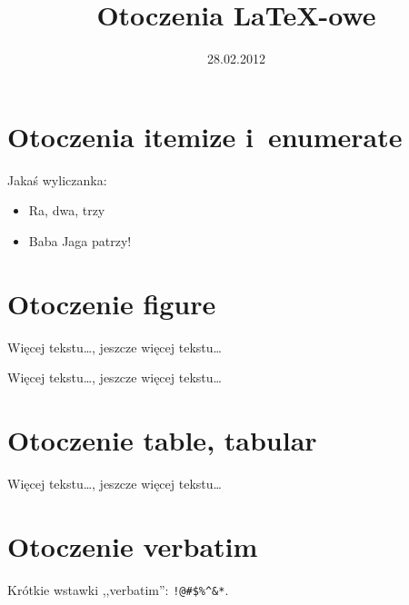 \documentclass[a4paper,12pt]{article}
\title{Otoczenia \LaTeX-owe}
\date{28.02.2012}
\begin{document}
\pagestyle{empty}

\section*{Otoczenia itemize i~enumerate}

Jakaś wyliczanka:

\begin{itemize}
\item Ra, dwa, trzy
\item Baba Jaga patrzy!
\end{itemize}


\section*{Otoczenie figure}

Więcej tekstu\ldots, jeszcze więcej tekstu\ldots

Więcej tekstu\ldots, jeszcze więcej tekstu\ldots


\section*{Otoczenie table, tabular}

Więcej tekstu\ldots, jeszcze więcej tekstu\ldots

\section*{Otoczenie verbatim}

Krótkie wstawki ,,verbatim'': \verb|!@#$%^&*|.
\end{document}
